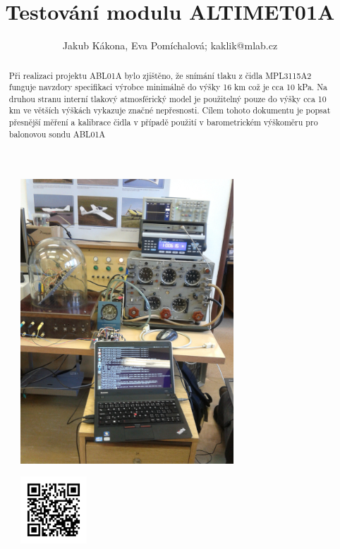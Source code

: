 \documentclass[12pt,a4paper,oneside]{article}
\begin{document}
\title{Testování modulu ALTIMET01A}
\author{Jakub Kákona, Eva Pomíchalová; kaklik@mlab.cz}
\maketitle

\thispagestyle{empty}
\begin{abstract}
Při realizaci projektu ABL01A bylo zjištěno, že snímání tlaku z čidla MPL3115A2 funguje navzdory specifikaci výrobce minimálně do výšky 16 km což je cca 10 kPa. Na druhou stranu interní tlakový atmosférický model je použitelný pouze do výšky cca 10 km ve větších výškách vykazuje značné nepřesnosti. Cílem tohoto dokumentu je popsat přesnější měření a kalibrace čidla v případě použití v barometrickém výškoměru pro balonovou sondu ABL01A
\end{abstract}

\begin{figure} [htbp]
\begin{center}
\includegraphics [width=80mm] {./img/altimet01a_testing_setup.jpg} 
\end{center}
\end{figure}

\begin{figure} [b]
\includegraphics [width=25mm] {./img/ALTIMET01A_QRcode.png} 
\end{figure}
\end{document}

